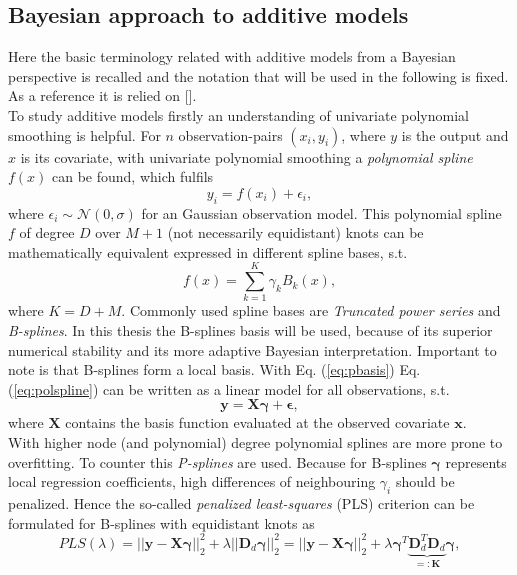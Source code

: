 \documentclass[12pt,letterpaper]{article}
\numberwithin{equation}{subsection}
\begin{document}
\subsection{Bayesian approach to additive models}
Here the basic terminology related with additive models from a Bayesian perspective is recalled and the notation that will be used in the following is fixed. As a reference it is relied on [\cite{bayessm}]. \\
To study additive models firstly an understanding of univariate polynomial smoothing is helpful. For $n$ observation-pairs $(x_i, y_i)$, where $y$ is the output and $x$ is its covariate, with univariate polynomial smoothing a \textit{polynomial spline} $f(x)$ can be found, which fulfils 
\begin{equation}
y_i = f(x_i) + \epsilon_i,
\label{eq:polspline}
\end{equation}
where $\epsilon_i \sim \mathcal{N}(0,\sigma)$ for an Gaussian observation model. This polynomial spline $f$ of degree $D$ over $M+1$ (not necessarily equidistant) knots can be mathematically equivalent expressed in different spline bases, s.t.  
\begin{equation}
f(x) = \sum^K_{k=1}\gamma_k B_k(x),
\label{eq:pbasis}
\end{equation}
where $K = D + M.$
Commonly used spline bases are \textit{Truncated power series} and \textit{B-splines}. In this thesis the B-splines basis will be used, because of its superior numerical stability and its more adaptive Bayesian interpretation. Important to note is that B-splines form a local basis. With Eq. (\ref{eq:pbasis}) Eq. (\ref{eq:polspline}) can be written as a linear model for all observations, s.t.
\begin{equation}
\mathbf{y} = \mathbf{X} \mathbf{ \gamma } + \mathbf{\epsilon},
\end{equation}
where $\mathbf{X}$ contains the basis function evaluated at the observed covariate $\mathbf{x}$. \\
With higher node (and polynomial) degree polynomial splines are more prone to overfitting. To counter this \textit{P-splines} are used. Because for B-splines $\mathbf{\gamma}$ represents local regression coefficients, high differences of neighbouring $\gamma_i$ should be penalized. Hence the so-called \textit{penalized least-squares} (PLS) criterion can be formulated for B-splines with equidistant knots as
\begin{equation}
PLS(\lambda) = ||\mathbf{y} - \mathbf{X}\mathbf{\gamma}||^2_2 +
 \lambda||\mathbf{D}_d\mathbf{\gamma}||^2_2 = ||\mathbf{y} - \mathbf{X}\mathbf{\gamma}||^2_2 +  \lambda\mathbf{\gamma}^T\underbrace{\mathbf{D}_d^T\mathbf{D}_d}_{=:\mathbf{K}}\mathbf{\gamma},
\end{equation}
\end{document}
